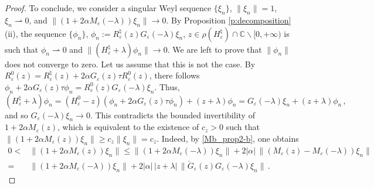 \documentclass[a4paper,11pt,reqno]{amsart}
\theoremstyle{definition}
\numberwithin{equation}{section}
\newcommand{\CO}{\mathbb C}
\newcommand{\ve}{\varepsilon}
\newcommand{\bosfer}{{\natural}}
\begin{document}
\begin{proof}
\par
To conclude, we consider a singular Weyl sequence $\{\xi_n\}$, $\|\xi_n\|= 1$, $\xi_n \rightharpoonup 0$, and $\|(1  + 2\alpha M_{\ve}(-\lambda))\xi_n\|\to 0$. By Proposition \ref{p:decomposition}(ii), the sequence $\{\phi_{n}\}$, $\phi_{n}:=R^{\bosfer}_{\ve}(z)G_{\ve}(-\lambda)\xi_{n}$, $z\in \rho(H^\bosfer_\ve) \cap \CO\backslash[0,+\infty)$ is such that $\phi_n \rightharpoonup 0$ and $\|(H^\bosfer_\ve+\lambda)\phi_{n}\|\to 0$. We are left to prove that $\|\phi_{n}\|$ does not converge to zero. Let us assume that this is not the case. By $R^{0}_{\ve}(z)=R^{\bosfer}_{\ve}(z)+2\alpha G_{\ve}(z)\tau R^{0}_{\ve}(z)$, there follows $\phi_{n}+2\alpha G_{\ve}(z)\tau\phi_{n}=R^{0}_{\ve}(z)G_{\ve}(-\lambda)\xi_{n}$. Thus,
\[
(H^\bosfer_\ve+\lambda)\phi_{n}=(H^{0}_{\ve}-z)(\phi_{n}+2\alpha G_{\ve}(z)\tau\phi_{n})+(z+\lambda)\phi_{n}=G_{\ve}(-\lambda)\xi_{n}+(z+\lambda)\phi_{n}\,,
\]
and so $G_{\ve}(-\lambda)\xi_{n}\to 0$. This contradicts the bounded invertibility of $1+2\alpha M_{\ve}(z)$, which is equivalent to the existence of  $c_{z}>0$ such that $\|(1+2\alpha M_{\ve}(z))\xi_{n}\|\ge c_{z}\|\xi_{n}\|=c_{z}$. Indeed, by \eqref{Mb_prop2-b}, one obtains 
\begin{align*}
0<&\|(1+2\alpha M_{\ve}(z))\xi_{n}\|\le \|(1+2\alpha M_{\ve}(-\lambda))\xi_{n}\|+
2|\alpha|\,\|(M_{\ve}(z)-M_{\ve}(-\lambda))\xi_{n}\|\\
=&\|(1+2\alpha M_{\ve}(-\lambda))\xi_{n}\|+2|\alpha|\,|z+\lambda |
\,\|\breve G_{\ve}(z)G_{\ve}(-\lambda)\xi_{n}\|\,.
\end{align*}
\end{proof}
\end{document}
